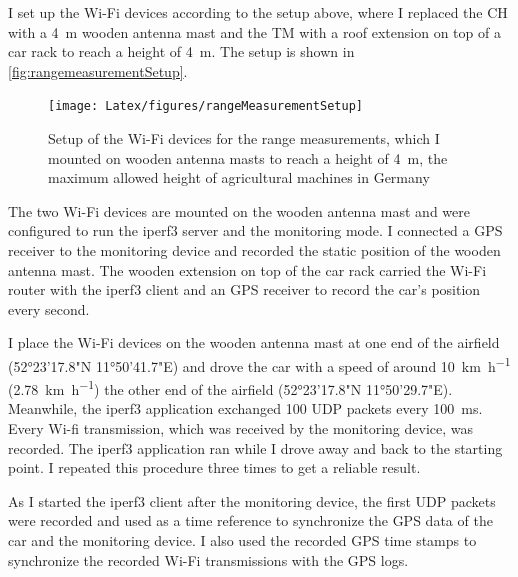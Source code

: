 I set up the Wi-Fi devices according to the setup above, where I replaced the \ac{CH} with a \SI{4}{\metre} wooden antenna mast and
the \ac{TM} with a roof extension on top of a car rack to reach a height of \SI{4}{\metre}.
The setup is shown in \autoref{fig:rangemeasurementSetup}.
\begin{figure}[]%
   \centering
   \texttt{[image: Latex/figures/rangeMeasurementSetup]}
   \caption{Setup of the Wi-Fi devices for the range measurements, which I mounted on wooden antenna masts to reach a height of \SI{4}{\metre}, the
   maximum allowed height of agricultural machines in Germany}
   \label{fig:rangemeasurementSetup}%
\end{figure}

The two Wi-Fi devices are mounted on the wooden antenna mast and were configured to run the iperf3 server and the monitoring mode.
I connected a \ac{GPS} receiver to the monitoring device and recorded the static position of the wooden antenna mast.
The wooden extension on top of the car rack carried the Wi-Fi router with the iperf3 client and an \ac{GPS} receiver to record the car's position every
second.

I place the Wi-Fi devices on the wooden antenna mast at one end of the airfield (52°23'17.8"N 11°50'41.7"E)
and drove the car with a speed of around \SI{10}{\kilo\metre\per\hour} (\SI{2.78}{\kilo\metre\per\hour}) the other end
of the airfield (52°23'17.8"N 11°50'29.7"E). Meanwhile, the iperf3 application exchanged \SI{100}{\byte} \ac{UDP} packets every
\SI{100}{\milli\second}.
Every Wi-fi transmission, which was received by the monitoring device, was recorded.
The iperf3 application ran while I drove away and back to the starting point.
I repeated this procedure three times to get a reliable result.

As I started the iperf3 client after the monitoring device, the first \ac{UDP} packets were recorded and used as a time reference to
synchronize the \ac{GPS} data of the car and the monitoring device.
I also used the recorded GPS time stamps to synchronize the recorded Wi-Fi transmissions with the \ac{GPS} logs.

